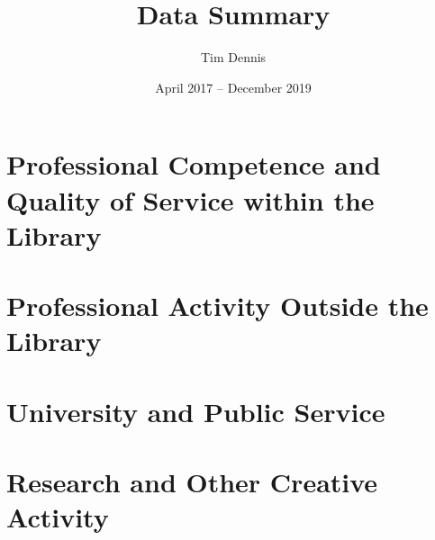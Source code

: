 \documentclass[12pt, oneside]{article}
\author{Tim Dennis}
\title{Data Summary}
\date{April 2017 -- December 2019}
\begin{document}
\maketitle

\thispagestyle{fancy}



\section{Professional Competence and Quality of Service within the Library}




\section{Professional Activity Outside the Library}



\section{University and Public Service}



\section{Research and Other Creative Activity}


\end{document}
